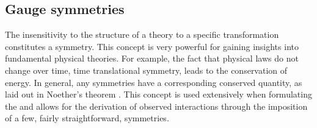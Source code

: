 \subsection{Gauge symmetries}
\label{sec:gaugeSymmetries}

The insensitivity to the structure of a theory to a specific
transformation constitutes a symmetry. This concept is very powerful
for gaining insights into fundamental physical theories. For example,
the fact that physical laws do not change over time, time
translational symmetry, leads to the conservation of energy.  In
general, any symmetries have a corresponding conserved quantity, as
laid out in Noether's theorem \cite{1971TTSP....1..186N}. This concept
is used extensively when formulating the \SM and allows for the
derivation of observed interactions through the imposition of a few,
fairly straightforward, symmetries.

